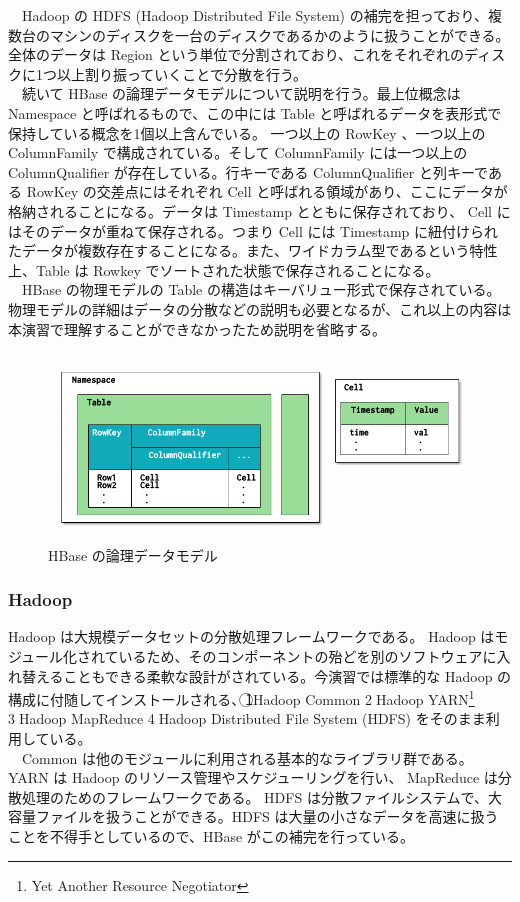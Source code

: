\documentclass{scrartcl}
\begin{document}
　Hadoop の HDFS (Hadoop Distributed File System) の補完を担っており、複数台のマシンのディスクを一台のディスクであるかのように扱うことができる。全体のデータは Region という単位で分割されており、これをそれぞれのディスクに1つ以上割り振っていくことで分散を行う。\\
　続いて HBase の論理データモデルについて説明を行う。最上位概念は Namespace と呼ばれるもので、この中には Table と呼ばれるデータを表形式で保持している概念を1個以上含んでいる。 一つ以上の RowKey 、一つ以上の ColumnFamily で構成されている。そして ColumnFamily には一つ以上の ColumnQualifier が存在している。行キーである ColumnQualifier と列キーである RowKey の交差点にはそれぞれ Cell と呼ばれる領域があり、ここにデータが格納されることになる。データは Timestamp とともに保存されており、 Cell にはそのデータが重ねて保存される。つまり Cell には Timestamp に紐付けられたデータが複数存在することになる。また、ワイドカラム型であるという特性上、Table は Rowkey でソートされた状態で保存されることになる。\\
　HBase の物理モデルの Table の構造はキーバリュー形式で保存されている。物理モデルの詳細はデータの分散などの説明も必要となるが、これ以上の内容は本演習で理解することができなかったため説明を省略する。\\

\begin{figure}[htbp]
\centering
\includegraphics[width=.9\linewidth]{hoge2.png}
\caption{HBase の論理データモデル}
\end{figure}

\subsubsection{Hadoop}
\label{sec:org504badd}
Hadoop は大規模データセットの分散処理フレームワークである。 Hadoop はモジュール化されているため、そのコンポーネントの殆どを別のソフトウェアに入れ替えることもできる柔軟な設計がされている。今演習では標準的な Hadoop の構成に付随してインストールされる、\textcircled{\scriptsize 1}Hadoop Common \textcircled{\scriptsize 2}Hadoop YARN\footnote{Yet Another Resource Negotiator} \textcircled{\scriptsize 3}Hadoop MapReduce \textcircled{\scriptsize 4}Hadoop Distributed File System (HDFS) をそのまま利用している。\\
　Common は他のモジュールに利用される基本的なライブラリ群である。 YARN は Hadoop のリソース管理やスケジューリングを行い、 MapReduce は分散処理のためのフレームワークである。 HDFS は分散ファイルシステムで、大容量ファイルを扱うことができる。HDFS は大量の小さなデータを高速に扱うことを不得手としているので、HBase がこの補完を行っている。\\
\end{document}
